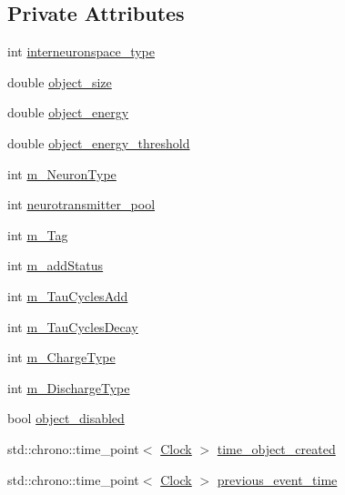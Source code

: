 \subsection*{Private Attributes}
\begin{DoxyCompactItemize}
\item 
int \mbox{\hyperlink{classInterneuronSpace_af520cb6f8766c77b1e575b2b65393cce}{interneuronspace\+\_\+type}}
\item 
double \mbox{\hyperlink{classInterneuronSpace_aff15cb40feb85e4b75c1bdc31604f333}{object\+\_\+size}}
\item 
double \mbox{\hyperlink{classInterneuronSpace_acfef881bda3b9184542530453075d1b1}{object\+\_\+energy}}
\item 
double \mbox{\hyperlink{classInterneuronSpace_a822a704e13dc60edfc5cb710e52150c3}{object\+\_\+energy\+\_\+threshold}}
\item 
int \mbox{\hyperlink{classInterneuronSpace_aedb61682c1c2a374645e21abd4526825}{m\+\_\+\+Neuron\+Type}}
\item 
int \mbox{\hyperlink{classInterneuronSpace_a5065916461ffbe096fe6bbb6503a767e}{neurotransmitter\+\_\+pool}}
\item 
int \mbox{\hyperlink{classInterneuronSpace_a5a4e1290b3bbb384597f111419be9c76}{m\+\_\+\+Tag}}
\item 
int \mbox{\hyperlink{classInterneuronSpace_a9f49bd1364861ea859f1a66c606cff8a}{m\+\_\+add\+Status}}
\item 
int \mbox{\hyperlink{classInterneuronSpace_ae71819def096138a0fb466cbe3f4bf02}{m\+\_\+\+Tau\+Cycles\+Add}}
\item 
int \mbox{\hyperlink{classInterneuronSpace_ac5c246784a31e7299aec57b2861a87e7}{m\+\_\+\+Tau\+Cycles\+Decay}}
\item 
int \mbox{\hyperlink{classInterneuronSpace_aa8a5afd05659a9bbfd0934de9ea3cd53}{m\+\_\+\+Charge\+Type}}
\item 
int \mbox{\hyperlink{classInterneuronSpace_abaa8436af9b85307c65de2755a010297}{m\+\_\+\+Discharge\+Type}}
\item 
bool \mbox{\hyperlink{classInterneuronSpace_a42f0a8cfca4592f0a6b47219df489396}{object\+\_\+disabled}}
\item 
std\+::chrono\+::time\+\_\+point$<$ \mbox{\hyperlink{universe_8h_a0ef8d951d1ca5ab3cfaf7ab4c7a6fd80}{Clock}} $>$ \mbox{\hyperlink{classInterneuronSpace_a5504d64df22fd330cdd14b4aca0171ea}{time\+\_\+object\+\_\+created}}
\item 
std\+::chrono\+::time\+\_\+point$<$ \mbox{\hyperlink{universe_8h_a0ef8d951d1ca5ab3cfaf7ab4c7a6fd80}{Clock}} $>$ \mbox{\hyperlink{classInterneuronSpace_a28efcbf608d5dd02f9dd85bec76a7650}{previous\+\_\+event\+\_\+time}}

\end{DoxyCompactItemize}
